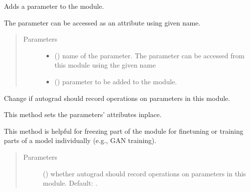 \documentclass[letterpaper,10pt,english]{sphinxmanual}
\begin{document}
\begin{fulllineitems}

\begin{fulllineitems}
\label{\detokenize{api/dynamics:geology.metamodelling.dynamics.NeuralDifferentialEquation.register_parameter}}
Adds a parameter to the module.

The parameter can be accessed as an attribute using given name.
\begin{quote}\begin{description}
\item[{Parameters}] \leavevmode\begin{itemize}
\item {} 
 () \textendash{} name of the parameter. The parameter can be accessed
from this module using the given name

\item {} 
 () \textendash{} parameter to be added to the module.

\end{itemize}

\end{description}\end{quote}

\end{fulllineitems}


\begin{fulllineitems}
\label{\detokenize{api/dynamics:geology.metamodelling.dynamics.NeuralDifferentialEquation.requires_grad_}}
Change if autograd should record operations on parameters in this
module.

This method sets the parameters’  attributes
in\sphinxhyphen{}place.

This method is helpful for freezing part of the module for finetuning
or training parts of a model individually (e.g., GAN training).
\begin{quote}\begin{description}
\item[{Parameters}] \leavevmode
{} () \textendash{} whether autograd should record operations on
parameters in this module. Default: .


\end{description}
\end{quote}
\end{fulllineitems}
\end{fulllineitems}
\end{document}

